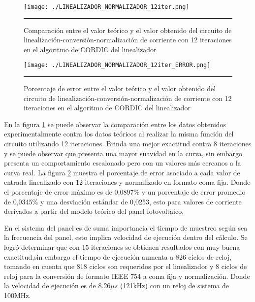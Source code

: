 \newpage
\begin{figure}[H]
  \centering
    \texttt{[image: ./LINEALIZADOR\_NORMALIZADOR\_12iter.png]}
    \rule{35em}{0.5pt}
  \caption[Comparación entre el valor teórico y el valor obtenido del circuito de linealización-conversión-normalización de corriente con 12 iteraciones en el algoritmo de CORDIC del linealizador]{Comparación entre el valor teórico y el valor obtenido del circuito de linealización-conversión-normalización de corriente con 12 iteraciones en el algoritmo de CORDIC del linealizador}
  \label{fig:LIN_NOR_12}
\end{figure}


\begin{figure}[H]
  \centering
    \texttt{[image: ./LINEALIZADOR\_NORMALIZADOR\_12iter\_ERROR.png]}
    \rule{35em}{0.5pt}
  \caption[Porcentaje de error entre el valor teórico y el valor obtenido del circuito de linealización-conversión-normalización de corriente con 12 iteraciones en el algoritmo de CORDIC del linealizador]{Porcentaje de error entre el valor teórico y el valor obtenido del circuito de linealización-conversión-normalización de corriente con 12 iteraciones en el algoritmo de CORDIC del linealizador}
  \label{fig:LIN_NOR_12_E}
\end{figure}

En la figura \ref{fig:LIN_NOR_12} se puede observar la comparación entre los datos obtenidos experimentalmente contra los datos teóricos al realizar la misma función del circuito utilizando 12 iteraciones. Brinda una mejor exactitud contra 8 iteraciones y se puede observar que presenta una mayor suavidad en la curva, sin embargo presenta un comportamiento escalonado pero con un valores más cercanos a la curva real. 
La figura \ref{fig:LIN_NOR_12_E} muestra el porcentaje de error asociado a cada valor de entrada linealizado con 12 iteraciones y normalizado en formato coma fija. Donde el porcentaje de error máximo es de 0,0897\% y un porcentaje de error promedio de 0,0345\% y una desviación estándar de 0,0253, esto para valores de corriente derivados a partir del modelo teórico del panel fotovoltaico.

En el sistema del panel es de suma importancia el tiempo de muestreo según sea la frecuencia del panel, esto implica velocidad de ejecución dentro del cálculo. Se logró determinar que con 15 iteraciones se obtienen resultados con muy buena exactitud,sin embargo el tiempo de ejecución aumenta a 826 ciclos de reloj, tomando en cuenta que 818 ciclos son requeridos por el linealizador y 8 ciclos de reloj para la conversión de formato IEEE 754 a coma fija y normalización. Donde la velocidad de ejecución es de 8.26$ \mu s$ (121kHz) con un reloj de sistema de 100MHz.  


